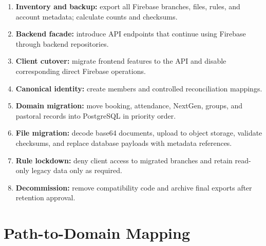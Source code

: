 \documentclass[11pt,a4paper,oneside]{report}
\begin{document}
\begin{enumerate}
  \item \textbf{Inventory and backup:} export all Firebase branches, files, rules, and account metadata; calculate counts and checksums.
  \item \textbf{Backend facade:} introduce API endpoints that continue using Firebase through backend repositories.
  \item \textbf{Client cutover:} migrate frontend features to the API and disable corresponding direct Firebase operations.
  \item \textbf{Canonical identity:} create members and controlled reconciliation mappings.
  \item \textbf{Domain migration:} move booking, attendance, NextGen, groups, and pastoral records into PostgreSQL in priority order.
  \item \textbf{File migration:} decode base64 documents, upload to object storage, validate checksums, and replace database payloads with metadata references.
  \item \textbf{Rule lockdown:} deny client access to migrated branches and retain read-only legacy data only as required.
  \item \textbf{Decommission:} remove compatibility code and archive final exports after retention approval.
\end{enumerate}

\section{Path-to-Domain Mapping}
\end{document}
